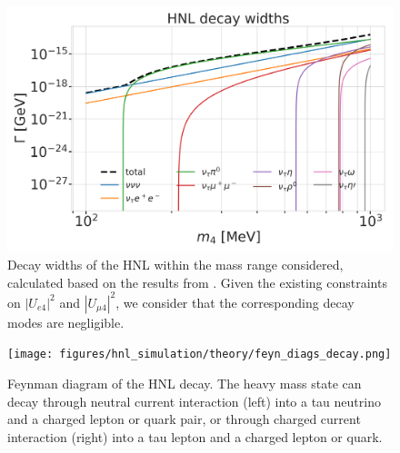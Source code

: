 \begin{figure}[h]
    \includegraphics{figures/hnl_simulation/decay_theory/hnl_decay_widths_up_to_1.0_GeV_log.png}
    \caption[HNL decay widths]{Decay widths of the HNL within the mass range considered, calculated based on the results from \cite{Coloma:2020lgy}. Given the existing constraints on $|U_{e4}|^{2}$ and $|U_{\mu4}|^{2}$, we consider that the corresponding decay modes are negligible.}
\end{figure}

\begin{figure}[h]
    \texttt{[image: figures/hnl\_simulation/theory/feyn\_diags\_decay.png]}
    \caption[Feynman diagram of heavy neutral lepton decay]{Feynman diagram of the HNL decay. The heavy mass state can decay through neutral current interaction (left) into a tau neutrino and a charged lepton or quark pair, or through charged current interaction (right) into a tau lepton and a charged lepton or quark.}
\end{figure}

